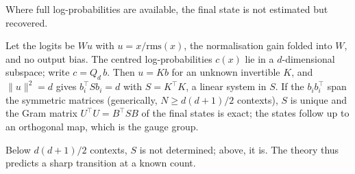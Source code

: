 Where full log-probabilities are available, the final state is not estimated but recovered.
\begin{theorem}\label{thm:exact}
Let the logits be $Wu$ with $u=x/\mathrm{rms}(x)$, the normalisation gain folded into $W$, and no output bias. The centred log-probabilities $c(x)$ lie in a $d$-dimensional subspace; write $c=Q_d\,b$. Then $u=Kb$ for an unknown invertible $K$, and $\|u\|^2=d$ gives $b_i^{\top}Sb_i=d$ with $S=K^{\top}K$, a linear system in $S$. If the $b_ib_i^{\top}$ span the symmetric matrices (generically, $N\ge d(d+1)/2$ contexts), $S$ is unique and the Gram matrix $U^{\top}U=B^{\top}SB$ of the final states is exact; the states follow up to an orthogonal map, which is the gauge group.
\end{theorem}
Below $d(d+1)/2$ contexts, $S$ is not determined; above, it is. The theory thus predicts a sharp transition at a known count.

